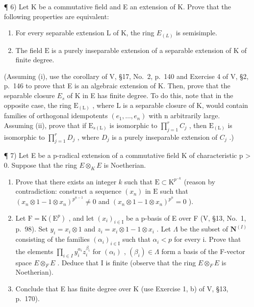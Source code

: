 ¶ 6) Let K be a commutative field and E an extension of K. Prove that the following properties are equivalent:

\begin{enumerate}
\def\labelenumi{(\roman{enumi})}
\item
  For every separable extension L of K, the ring \(E_{(L)}\) is semisimple.
\item
  The field \(\mathrm{E}\) is a purely inseparable extension of a separable extension of \(\mathrm{K}\) of finite degree.
\end{enumerate}

(Assuming (i), use the corollary of V, §17, No.~2, p.~140 and Exercise 4 of V, §2, p.~146 to prove that E is an algebraic extension of K. Then, prove that the separable closure \(E_{s}\) of K in E has finite degree. To do this, note that in the opposite case, the ring \(\mathrm{E}_{(\mathrm{L})}\) , where L is a separable closure of K, would contain families of orthogonal idempotents \((e_{1},\ldots,e_{n})\) with n arbitrarily large. Assuming (ii), prove that if \(\mathrm{E}_{s(\mathrm{L})}\) is isomorphic to \(\prod_{j=1}^{r}C_{j}\) , then \(\mathrm{E}_{(\mathrm{L})}\) is isomorphic to \(\prod_{j=1}^{r}D_{j}\) , where \(D_{j}\) is a purely inseparable extension of \(C_{j}\) .)

¶ 7) Let E be a p-radical extension of a commutative field K of characteristic p \textgreater{} 0. Suppose that the ring \(E \otimes_{K} E\) is Noetherian.

\begin{enumerate}
\def\labelenumi{\alph{enumi})}
\item
  Prove that there exists an integer \(k\) such that \(\mathrm{E} \subset \mathrm{K}^{p^{-k}}\) (reason by contradiction: construct a sequence \((x_{n})\) in \(\mathrm{E}\) such that \((x_{n} \otimes 1 - 1 \otimes x_{n})^{p^{n-1}} \neq 0\) and \((x_{n} \otimes 1 - 1 \otimes x_{n})^{p^n} = 0\) ).
\item
  Let \(\mathrm{F} = \mathrm{K}(\mathrm{E}^{p})\) , and let \((x_{i})_{i \in \mathrm{I}}\) be a p-basis of E over F (V, §13, No.~1, p.~98). Set \(y_{i} = x_{i} \otimes 1\) and \(z_{i} = x_{i} \otimes 1 - 1 \otimes x_{i}\) . Let \(\Lambda\) be the subset of \(\mathbf{N}^{(I)}\) consisting of the families \((\alpha_{i})_{i \in \mathrm{I}}\) such that \(\alpha_{i} < p\) for every i. Prove that the elements \(\prod_{i \in I} y_{i}^{\alpha_{i}} z_{i}^{\beta_{i}}\) for \((\alpha_{i})\) , \((\beta_{i}) \in \Lambda\) form a basis of the F-vector space \(E \otimes_{F} E\) . Deduce that I is finite (observe that the ring \(E \otimes_{F} E\) is Noetherian).
\item
  Conclude that E has finite degree over K (use Exercise 1, b) of V, §13, p.~170).
\end{enumerate}

